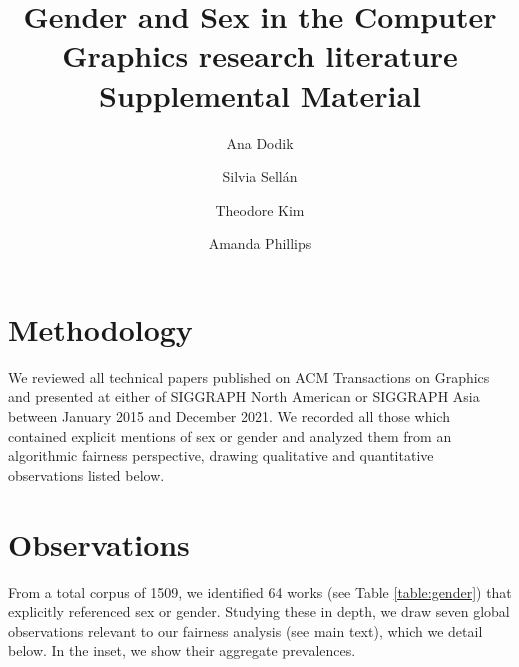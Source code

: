 \documentclass[nonacm,sigconf,review,balance=false]{acmart}
\begin{document}
\title{Gender and Sex in the Computer Graphics research literature \\
\Large{Supplemental Material}}

\author{Ana Dodik}

\author{Silvia Sellán}\authornotemark[1]


\author{Theodore Kim}

\author{Amanda Phillips}



\maketitle

\section{Methodology}

We reviewed all technical papers published on ACM Transactions on Graphics and
presented at either of SIGGRAPH North American or SIGGRAPH Asia between
January 2015 and December 2021. We recorded all those which contained
explicit mentions of sex or gender and analyzed them from an algorithmic fairness perspective, drawing qualitative and quantitative observations listed below.

\section{Observations}

From a total corpus of 1509, we identified 64 works (see Table \ref{table:gender}) that explicitly referenced sex or gender. Studying these in depth, we draw seven global observations relevant to our fairness analysis (see main text), which we detail below. In the inset, we show their aggregate prevalences. 
\end{document}
